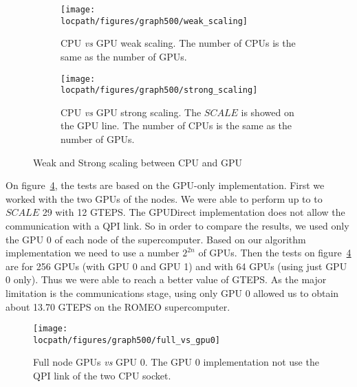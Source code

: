 \begin{figure}[htb]
\begin{subfigure}[t]{0.48\linewidth}
\centering
\texttt{[image: \\locpath/figures/graph500/weak\_scaling]}
\caption[]{CPU \textit{vs} GPU weak scaling. The number of CPUs is the same as the number of GPUs.}
\label{fig:bfs_weak_scaling}
\end{subfigure}
\hfill
\begin{subfigure}[t]{0.48\linewidth}
\centering
\texttt{[image: \\locpath/figures/graph500/strong\_scaling]}
\caption[]{CPU \textit{vs} GPU strong scaling. The $SCALE$ is showed on the GPU line. The number of CPUs is the same as the number of GPUs.}
\label{fig:bfs_strong_scaling}
\end{subfigure}
\caption{Weak and Strong scaling between CPU and GPU}
\end{figure}


On figure~\ref{fig:full_vs_gpu0}, the tests are based on the GPU-only implementation. 
First we worked with the two GPUs of the nodes. 
We were able to perform up to to $SCALE$ 29 with 12 GTEPS. 
The GPUDirect implementation does not allow the communication with a QPI link. 
So in order to compare the results, we used only the GPU 0 of each node of the supercomputer. 
Based on our algorithm implementation we need to use a number $2^{2n}$ of GPUs. 
Then the tests on figure~\ref{fig:full_vs_gpu0} are for 256 GPUs (with GPU 0 and GPU 1) and with 64 GPUs (using just GPU 0 only). 
Thus we were able to reach a better value of GTEPS. 
As the major limitation is the communications stage, using only GPU 0 allowed us to obtain about 13.70 GTEPS on the ROMEO supercomputer. 

\begin{figure}[!t]
\centering
\texttt{[image: \\locpath/figures/graph500/full\_vs\_gpu0]}
\caption[]{Full node GPUs \textit{vs} GPU 0. The GPU 0 implementation not use the QPI link of the two CPU socket.}
\label{fig:full_vs_gpu0}
\end{figure}

